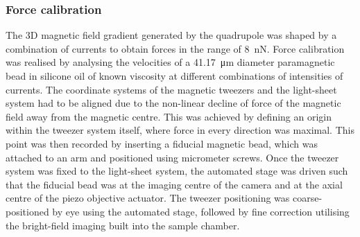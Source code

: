 \subsubsection{Force calibration}

The 3D magnetic field gradient generated by the quadrupole was shaped by a combination of currents to obtain forces in the range of \SI{8}{\nano\newton}.
Force calibration was realised by analysing the velocities of a \SI{41.17}{\micro\metre} diameter paramagnetic bead in silicone oil of known viscosity at different combinations of intensities of currents.
The coordinate systems of the magnetic tweezers and the light-sheet system had to be aligned due to the non-linear decline of force of the magnetic field away from the magnetic centre.
This was achieved by defining an origin within the tweezer system itself, where force in every direction was maximal.
This point was then recorded by inserting a fiducial magnetic bead, which was attached to an arm and positioned using micrometer screws.
Once the tweezer system was fixed to the light-sheet system, the automated stage was driven such that the fiducial bead was at the imaging centre of the camera and at the axial centre of the piezo objective actuator.
The tweezer positioning was coarse-positioned by eye using the automated stage, followed by fine correction utilising the bright-field imaging built into the sample chamber.


